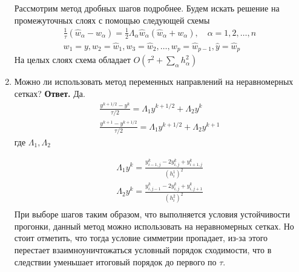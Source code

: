 \documentclass{article}
\begin{document}
\begin{enumerate}
		Рассмотрим метод дробных шагов подробнее. 
		Будем искать решение на промежуточных слоях с помощью следующей схемы 
		\begin{gather*}
			\frac{1}{\tau}(\hat{w}_\alpha - w_\alpha) = \frac{1}{2} \Lambda_\alpha
			\hat{w}_\alpha (\hat{w}_\alpha + w_\alpha), \quad  \alpha = 1, 2, \ldots, n \\ 
			w_1 = y, w_2 = \hat{w}_1, w_3 = \hat{w}_2, \ldots, w_p = \hat{w}_{p-1},
			\hat{y} = \hat{w}_p
		\end{gather*}
		На целых слоях схема обладает $O(\tau^2 + \sum_{\alpha} h_\alpha^2)$
		\item Можно ли использовать метод переменных направлений
		на неравномерных сетках?
		\newline
		{\bfseries Ответ. } 
		Да.
		\begin{gather*}
			\frac{y^{k+1/2} - y^k}{\tau/2} = \Lambda_1 y^{k+1/2} + \Lambda_2 y^k \\ 
			\frac{y^{k+1} - y^{k+1/2}}{\tau/2} = \Lambda_1 y^{k+1/2} + \Lambda_2 y^{k+1} 
		\end{gather*}
		где $\Lambda_1, \Lambda_2 $
		
		\begin{gather*}
			\Lambda_1y^k = \frac{y^k_{i-1,j} - 2y^k_{i,j} + y^k_{i+1,j}}{(h^1_i)^2} \\
			\Lambda_2y^k = \frac{y^k_{i,j-1} - 2y^k_{i,j} + y^k_{i,j+1}}{(h^2_i)^2} \\
		\end{gather*}
		При выборе шагов таким образом, что 
		выполняется условия устойчивости прогонки, данный метод можно использовать 
		на неравномерных сетках.
		Но стоит отметить, что тогда условие симметрии пропадает, из-за этого перестает 
		взаимноуничтожаться условный порядок сходимости, что в следствии уменьшает итоговый
		порядок до первого по $\tau$.

	\end{enumerate}
\end{document}
